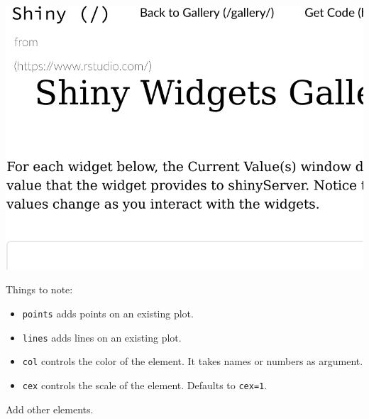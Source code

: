 \documentclass[]{book}
\providecommand{\tightlist}{%
  \setlength{\itemsep}{0pt}\setlength{\parskip}{0pt}}
\theoremstyle{definition}
\theoremstyle{definition}
\theoremstyle{definition}
\theoremstyle{remark}
\begin{document}
\includegraphics[width=0.5\linewidth]{Rcourse_files/figure-latex/unnamed-chunk-268-1}

Things to note:

\begin{itemize}
\tightlist
\item
  \texttt{points} adds points on an existing plot.
\item
  \texttt{lines} adds lines on an existing plot.
\item
  \texttt{col} controls the color of the element. It takes names or numbers as argument.
\item
  \texttt{cex} controls the scale of the element. Defaults to \texttt{cex=1}.
\end{itemize}

Add other elements.
\end{document}
